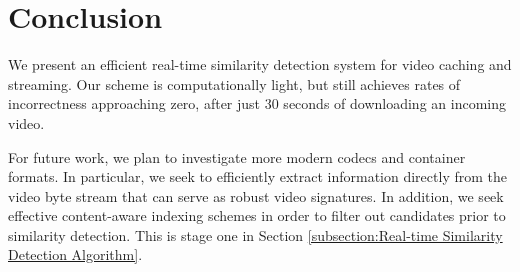 \documentclass{article}
\begin{document}
\section{Conclusion}
\label{section:Conclusion}
We present an efficient real-time similarity detection system for video caching and streaming. Our scheme is computationally light, but still achieves rates of incorrectness approaching zero, after just $30$ seconds of downloading an incoming video.

For future work, we plan to investigate more modern codecs and container formats. In particular, we seek to efficiently extract information directly from the video byte stream that can serve as robust video signatures. In addition, we seek effective content-aware indexing schemes in order to filter out candidates prior to similarity detection. This is stage one in Section \ref{subsection:Real-time Similarity Detection Algorithm}.
\end{document}

